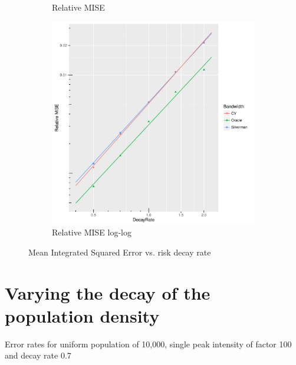 \begin{figure}[htb]
\begin{subfigure}[b]{0.3\textwidth}
    \caption{Relative MISE}
    \end{subfigure}
    \begin{subfigure}[b]{0.3\textwidth}
    \includegraphics[width=\textwidth]{results/by_cases_decay/RMISE-vs-risk-decay-log-log}
    \caption{Relative MISE log-log}
    \end{subfigure}
    \caption[MISE: by risk decay]{Mean Integrated Squared Error vs. risk decay rate}
    \label{fig:ise:unif_100_SD}
\end{figure}

\section{Varying the decay of the population density}
\label{sec:results:pSD_100_1h}

\begin{table}[htb]
\centering

\caption{Error rates for uniform population of 10,000, single peak intensity of factor 100 and decay rate 0.7}
\label{tbl:results:p0.7_100_1_1h}
\end{table}


